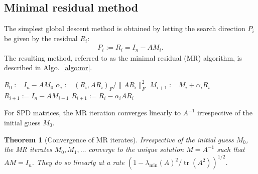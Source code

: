 \documentclass[numbers,webpdf,imanum]{ima-authoring-template}%
\theoremstyle{thmstyletwo}%
\newtheorem{theorem}{Theorem}%
\numberwithin{equation}{section}
\begin{document}
\subsection{Minimal residual method}
The simplest global descent method is obtained by letting the search direction $P_i$ be given by the residual $R_i$:
\begin{align}
P_i:=R_i=I_n-AM_i.
\end{align}
The resulting method, referred to as the minimal residual (MR) algorithm, is described in Algo.~\ref{algo:mr}.

\begin{algorithm}[ht]
\caption{MR($A$, $M_0$, $\texttt{ExplicitResidualUpdate}$)}
\label{algo:mr}
\begin{algorithmic}[1]
\State $R_0:=I_n-AM_0$
\State $\alpha_i:=(R_i,AR_i)_F/\|AR_i\|_F^2$
\State $M_{i+1}:=M_{i}+\alpha_i R_{i}$
\State $R_{i+1}:=I_n-AM_{i+1}$
\Else
\State $R_{i+1}:=R_i-\alpha_i AR_i$
\EndIf
\EndFor
\end{algorithmic}
\end{algorithm}

For SPD matrices, the MR iteration converges linearly to $A^{-1}$ irrespective of the initial guess $M_0$.

\begin{theorem}[Convergence of MR iterates]\label{theo:mr-convergence}
Irrespective of the initial guess $M_0$, the MR iterates $M_0,M_1,\dots$ converge to the unique solution $M=A^{-1}$ such that $AM=I_n$.
They do so linearly at a rate $(1-\lambda_{\min}(A)^2/\operatorname{tr}(A^2))^{1/2}$.
\end{theorem}
\end{document}
